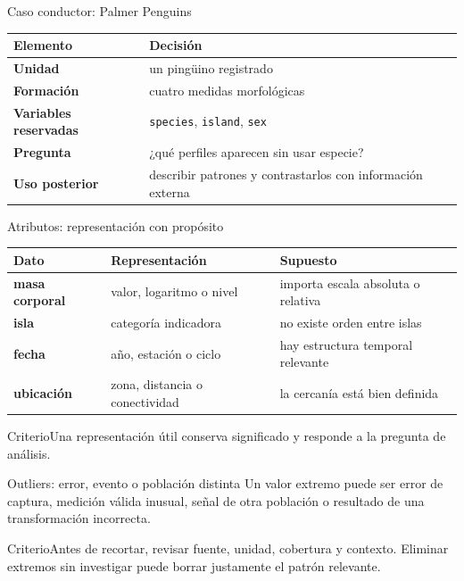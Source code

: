 \documentclass[aspectratio=169,10pt]{beamer}
\begin{document}
\begin{frame}{Caso conductor: Palmer Penguins}\small
\begin{tabularx}{\textwidth}{>{\bfseries}p{}X}\toprule Elemento & Decisión\\\midrule
Unidad & un pingüino registrado\\ Formación & cuatro medidas morfológicas\\ Variables reservadas & \texttt{species}, \texttt{island}, \texttt{sex}\\ Pregunta & ¿qué perfiles aparecen sin usar especie?\\ Uso posterior & describir patrones y contrastarlos con información externa\\\bottomrule\end{tabularx}
\end{frame}

\begin{frame}{Atributos: representación con propósito}\small
\begin{tabularx}{\textwidth}{>{\bfseries}p{}XX}\toprule Dato & Representación & Supuesto\\\midrule
masa corporal & valor, logaritmo o nivel & importa escala absoluta o relativa\\ isla & categoría indicadora & no existe orden entre islas\\ fecha & año, estación o ciclo & hay estructura temporal relevante\\ ubicación & zona, distancia o conectividad & la cercanía está bien definida\\\bottomrule\end{tabularx}
\begin{block}{Criterio}Una representación útil conserva significado y responde a la pregunta de análisis.\end{block}
\end{frame}

\begin{frame}{Outliers: error, evento o población distinta}\small
Un valor extremo puede ser error de captura, medición válida inusual, señal de otra población o resultado de una transformación incorrecta.
\begin{alertblock}{Criterio}Antes de recortar, revisar fuente, unidad, cobertura y contexto. Eliminar extremos sin investigar puede borrar justamente el patrón relevante.\end{alertblock}
\end{frame}
\end{document}
